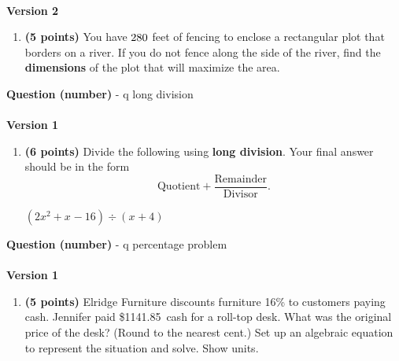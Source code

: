 \documentclass[12pt]{amsart}
\begin{document}
\begin{enumerate}[resume]
  
\vfill \vfill \vfill
 \end{enumerate}$ $ \\ {\bf Version 2} \\\begin{enumerate}[resume]
\item {\bf (5 points)} 
 You have $280$ feet of fencing to enclose a rectangular plot that borders on a river. If you do not fence along the side of the river, find the \textbf{dimensions} of the plot that will maximize the area. \\

  
\vfill \vfill \vfill
 \end{enumerate}\newpage\def \a{4}\def \b{2}\def \c{-7}\def \r{12}\def \monicpol{x^{}+4}\def \longnbad{2x^{2}+x^{}-16}\def \anspol{2x^{}-7}{\Large{\bf Question (number)}} - q long division\\ $ $ \\ {\bf Version 1} \\\begin{enumerate}[resume]
\item {\bf (6 points)} 
 Divide the following using {\bf long division}. Your final answer should be in the form $$ \text{Quotient} + \dfrac{\text{Remainder}}{\text{Divisor}}.$$

\vspace{3mm}

$(\longnbad) \div (\monicpol)$

\vfill  \vfill \vfill
 \end{enumerate}\newpage\newpage\def \discount{16}\def \paid{1141.85}\def \rainy{13.45}\def \orcost{1359.35}\def \purcost{984.35}\def \orrainy{16.01}{\Large{\bf Question (number)}} - q percentage problem\\ $ $ \\ {\bf Version 1} \\\begin{enumerate}[resume]
\item {\bf (5 points)} 
 Elridge Furniture discounts furniture \discount\% to customers paying cash. Jennifer paid \$\paid\ cash for a roll-top desk. What was the original price of the desk? (Round to the nearest cent.) Set up an algebraic equation to represent the situation and solve. Show units.


\end{enumerate}
\end{document}

